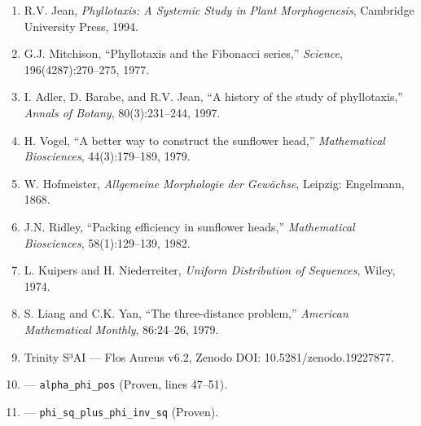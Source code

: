\begin{enumerate}
  \item R.V. Jean, \emph{Phyllotaxis: A Systemic Study in Plant
        Morphogenesis}, Cambridge University Press, 1994.
        \cite{jean1994phyllotaxis}

  \item G.J. Mitchison, ``Phyllotaxis and the Fibonacci series,''
        \emph{Science}, 196(4287):270--275, 1977. \cite{mitchison1977phyllotaxis}

  \item I. Adler, D. Barabe, and R.V. Jean, ``A history of the study
        of phyllotaxis,'' \emph{Annals of Botany}, 80(3):231--244, 1997.
        \cite{adler1997phyllotaxis}

  \item H. Vogel, ``A better way to construct the sunflower head,''
        \emph{Mathematical Biosciences}, 44(3):179--189, 1979.
        \cite{vogel1979better}

  \item W. Hofmeister, \emph{Allgemeine Morphologie der Gewächse},
        Leipzig: Engelmann, 1868. \cite{hofmeister1868allgemeine}

  \item J.N. Ridley, ``Packing efficiency in sunflower heads,''
        \emph{Mathematical Biosciences}, 58(1):129--139, 1982.
        \cite{ridley1982packing}

  \item L. Kuipers and H. Niederreiter, \emph{Uniform Distribution of
        Sequences}, Wiley, 1974. \cite{kuipers1974uniform}

  \item S. Liang and C.K. Yan, ``The three-distance problem,''
        \emph{American Mathematical Monthly}, 86:24--26, 1979.
        \cite{liang1979three}

  \item Trinity S³AI — Flos Aureus v6.2, Zenodo DOI: 10.5281/zenodo.19227877.
        \cite{trinity_anchor_zenodo}

  \item {}
        --- \texttt{alpha\_phi\_pos} (Proven, lines 47--51).

  \item {}
        --- \texttt{phi\_sq\_plus\_phi\_inv\_sq} (Proven).
\end{enumerate}


